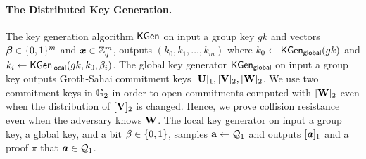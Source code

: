 
\paragraph{The Distributed Key Generation.} The key generation algorithm
$\mathsf{KGen}$ on input a group key $gk$ and vectors ${\boldsymbol{\beta}}\in\{0,1\}^m$ and ${\boldsymbol{x}}\in\mathbb{Z}_q^m$,  outputs $(k_0,k_1,\ldots,k_m)$ where $k_0 \gets \mathsf{KGen}_\mathsf{global}(gk)$ and  $k_i\gets \mathsf{KGen}_{\mathsf{local}}(gk,k_0,\beta_i)$. The global key generator $\mathsf{KGen}_\mathsf{global}$ on input a group key outputs Groth-Sahai commitment keys $[\mathbf{{U}}]_1,[\mathbf{{V}}]_2,[\mathbf{{W}}]_2$. We use two commitment keys in $\mathbb{G}_2$ in order to open commitments computed with $[\mathbf{{W}}]_2$ even when the distribution of $[\mathbf{{V}}]_2$ is changed. Hence, we prove collision resistance even when the adversary knows $\mathbf{{W}}$. The local key generator on input a group key, a global key, and a bit $\beta\in\{0,1\}$, samples $\mathbf{{a}}\gets\mathcal{Q}_1$ and outputs $[{\boldsymbol{a}}]_1$ and a proof $\pi$ that ${\boldsymbol{a}}\in\mathcal{Q}_1$.
